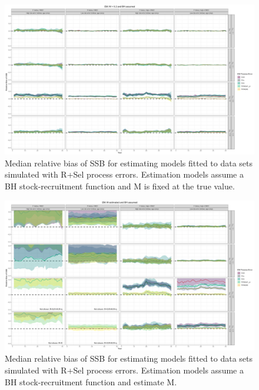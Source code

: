 \documentclass[
  12pt,
]{article}
\begin{document}
\begin{landscape}
\begin{figure}
\caption{Median relative bias of SSB for estimating models fitted to data sets simulated with R+Sel process errors. Estimation models assume a BH stock-recruitment function and M is fixed at the true value.}\label{Sel_om_em_BH_MF_relbias_ssb}
\begin{center}
\includegraphics[width = \textwidth]{Sel_om_BH_MF_relbias_ssb.png}
\end{center}
\end{figure}
\end{landscape}

\begin{landscape}
\begin{figure}
\caption{Median relative bias of SSB for estimating models fitted to data sets simulated with R+Sel process errors. Estimation models assume a BH stock-recruitment function and estimate M.}\label{Sel_om_em_BH_ME_relbias_ssb}
\begin{center}
\includegraphics[width = \textwidth]{Sel_om_BH_ME_relbias_ssb.png}
\end{center}
\end{figure}
\end{landscape}
\end{document}
